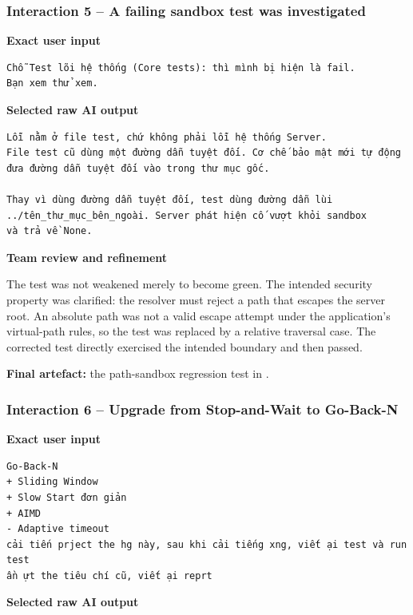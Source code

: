 \subsubsection{Interaction 5 -- A failing sandbox test was investigated}

\sourceA

\textbf{Exact user input}

\begin{lstlisting}
Chỗ Test lõi hệ thống (Core tests): thì mình bị hiện là fail.
Bạn xem thử xem.
\end{lstlisting}

\textbf{Selected raw AI output}

\begin{lstlisting}
Lỗi nằm ở file test, chứ không phải lỗi hệ thống Server.
File test cũ dùng một đường dẫn tuyệt đối. Cơ chế bảo mật mới tự động
đưa đường dẫn tuyệt đối vào trong thư mục gốc.

Thay vì dùng đường dẫn tuyệt đối, test dùng đường dẫn lùi
../tên_thư_mục_bên_ngoài. Server phát hiện cố vượt khỏi sandbox
và trả về None.
\end{lstlisting}

\textbf{Team review and refinement}

The test was not weakened merely to become green. The intended security
property was clarified: the resolver must reject a path that escapes the
server root. An absolute path was not a valid escape attempt under the
application's virtual-path rules, so the test was replaced by a relative
traversal case. The corrected test directly exercised the intended
 boundary and then passed.

\textbf{Final artefact:} the path-sandbox regression test in
.

\subsubsection{Interaction 6 -- Upgrade from Stop-and-Wait to Go-Back-N}

\sourceB

\textbf{Exact user input}

\begin{lstlisting}
Go-Back-N
+ Sliding Window
+ Slow Start đơn giản
+ AIMD
- Adaptive timeout
cải tiến prject the hg này, sau khi cải tiếng xng, viết ại test và run test
ần ựt the tiêu chí cũ, viết ại reprt
\end{lstlisting}

\textbf{Selected raw AI output}

